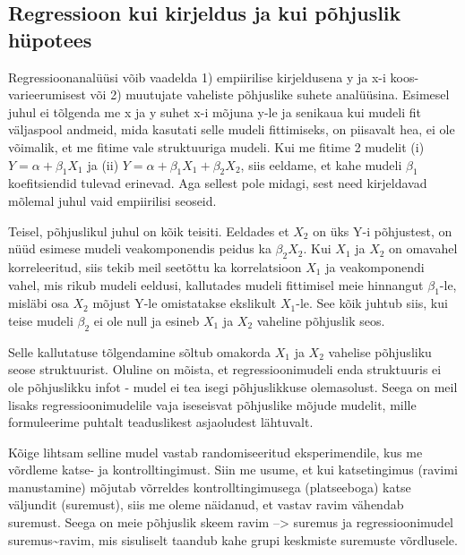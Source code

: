 \documentclass[]{book}
\begin{document}
\hypertarget{regressioon-kui-kirjeldus-ja-kui-pohjuslik-hupotees}{%
\subsection*{Regressioon kui kirjeldus ja kui põhjuslik hüpotees}\label{regressioon-kui-kirjeldus-ja-kui-pohjuslik-hupotees}}

Regressioonanalüüsi võib vaadelda 1) empiirilise kirjeldusena y ja x-i koos-varieerumisest või 2) muutujate vaheliste põhjuslike suhete analüüsina. Esimesel juhul ei tõlgenda me x ja y suhet x-i mõjuna y-le ja senikaua kui mudeli fit väljaspool andmeid, mida kasutati selle mudeli fittimiseks, on piisavalt hea, ei ole võimalik, et me fitime vale struktuuriga mudeli.
Kui me fitime 2 mudelit (i) \(Y = \alpha + \beta_1X_1\) ja (ii) \(Y = \alpha + \beta_1X_1 + \beta_2X_2\), siis eeldame, et kahe mudeli \(\beta_1\) koefitsiendid tulevad erinevad. Aga sellest pole midagi, sest need kirjeldavad mõlemal juhul vaid empiirilisi seoseid.

Teisel, põhjuslikul juhul on kõik teisiti. Eeldades et \(X_2\) on üks Y-i põhjustest, on nüüd esimese mudeli veakomponendis peidus ka \(\beta_2X_2\). Kui \(X_1\) ja \(X_2\) on omavahel korreleeritud, siis tekib meil seetõttu ka korrelatsioon \(X_1\) ja veakomponendi vahel, mis rikub mudeli eeldusi, kallutades mudeli fittimisel meie hinnangut \(\beta_1\)-le, misläbi osa \(X_2\) mõjust Y-le omistatakse ekslikult \(X_1\)-le. See kõik juhtub siis, kui teise mudeli \(\beta_2\) ei ole null ja esineb \(X_1\) ja \(X_2\) vaheline põhjuslik seos.

Selle kallutatuse tõlgendamine sõltub omakorda \(X_1\) ja \(X_2\) vahelise põhjusliku seose struktuurist. Oluline on mõista, et regressioonimudeli enda struktuuris ei ole põhjuslikku infot - mudel ei tea isegi põhjuslikkuse olemasolust. Seega on meil lisaks regressioonimudelile vaja iseseisvat põhjuslike mõjude mudelit, mille formuleerime puhtalt teaduslikest asjaoludest lähtuvalt.

Kõige lihtsam selline mudel vastab randomiseeritud eksperimendile, kus me võrdleme katse- ja kontrolltingimust. Siin me usume, et kui katsetingimus (ravimi manustamine) mõjutab võrreldes kontrolltingimusega (platseeboga) katse väljundit (suremust), siis me oleme näidanud, et vastav ravim vähendab suremust. Seega on meie põhjuslik skeem ravim --\textgreater{} suremus ja regressioonimudel suremus\textasciitilde{}ravim, mis sisuliselt taandub kahe grupi keskmiste suremuste võrdlusele.
\end{document}
